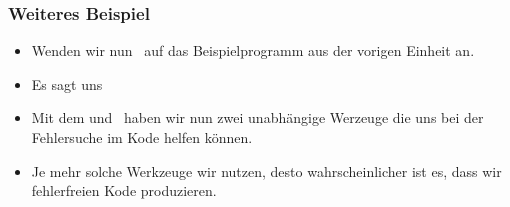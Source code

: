 \documentclass[aspectratio=169,mathserif,notheorems]{beamer}%
\begin{document}
%
\begin{frame}[t]%
\frametitle{Weiteres Beispiel}%
%
%
%
%
\begin{itemize}%
\item Wenden wir nun \mypy\ auf das Beispielprogramm  aus der vorigen Einheit an.%
\item<2-> Es sagt uns \emph{}%
\item<3-> Mit dem  und \mypy\ haben wir nun zwei unabhängige Werzeuge die uns bei der Fehlersuche im Kode helfen können.%
\item<4-> Je mehr solche Werkzeuge wir nutzen, desto wahrscheinlicher ist es, dass wir fehlerfreien Kode produzieren.%
\end{itemize}%
%
%
%
\end{frame}
%
\end{document}
